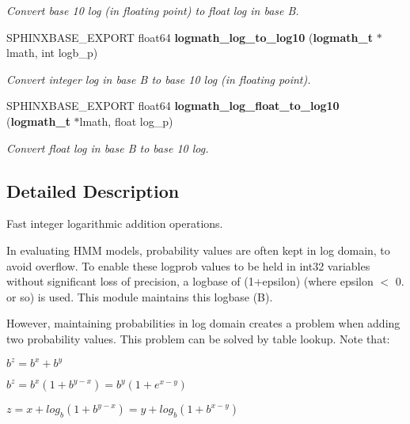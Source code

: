 \begin{DoxyCompactItemize}
\begin{DoxyCompactList}\small\item\em Convert base 10 log (in floating point) to float log in base B. \end{DoxyCompactList}\item 
S\+P\+H\+I\+N\+X\+B\+A\+S\+E\+\_\+\+E\+X\+P\+O\+R\+T float64 {\bf logmath\+\_\+log\+\_\+to\+\_\+log10} ({\bf logmath\+\_\+t} $\ast$lmath, int logb\+\_\+p)\label{logmath_8h_a7c17cb624003975e84fbd141ca6e2e06}

\begin{DoxyCompactList}\small\item\em Convert integer log in base B to base 10 log (in floating point). \end{DoxyCompactList}\item 
S\+P\+H\+I\+N\+X\+B\+A\+S\+E\+\_\+\+E\+X\+P\+O\+R\+T float64 {\bf logmath\+\_\+log\+\_\+float\+\_\+to\+\_\+log10} ({\bf logmath\+\_\+t} $\ast$lmath, float log\+\_\+p)\label{logmath_8h_a32491ca5b2688fb633d85ab866dcf858}

\begin{DoxyCompactList}\small\item\em Convert float log in base B to base 10 log. \end{DoxyCompactList}\end{DoxyCompactItemize}


\subsection{Detailed Description}
Fast integer logarithmic addition operations. 

In evaluating H\+M\+M models, probability values are often kept in log domain, to avoid overflow. To enable these logprob values to be held in int32 variables without significant loss of precision, a logbase of (1+epsilon) (where epsilon $<$ 0. or so) is used. This module maintains this logbase (B).

However, maintaining probabilities in log domain creates a problem when adding two probability values. This problem can be solved by table lookup. Note that\+:


\begin{DoxyItemize}
\item $ b^z = b^x + b^y $
\item $ b^z = b^x(1 + b^{y-x}) = b^y(1 + e^{x-y}) $
\item $ z = x + log_b(1 + b^{y-x}) = y + log_b(1 + b^{x-y}) $
\end{DoxyItemize}

